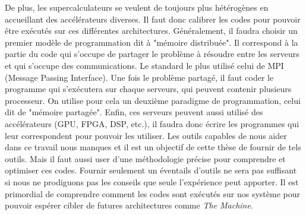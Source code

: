 De plus, les supercalculateurs se veulent de toujours plus hétérogènes en accueillant des accélérateurs diverses. Il faut donc calibrer les codes pour pouvoir être exécutés sur ces différentes architectures. Généralement, il faudra choisir un premier modèle de programmation dit à "mémoire distribuée". Il correspond à la partie du code qui s'occupe de partager le problème à résoudre entre les serveurs et qui s'occupe des communications. Le standard le plus utilisé celui de MPI (Message Passing Interface). Une fois le problème partagé, il faut coder le programme qui s'exécutera sur chaque serveurs, qui peuvent contenir plusieurs processeur. On utilise pour cela un deuxième paradigme de programmation, celui dit de "mémoire partagée". Enfin, ces serveurs peuvent aussi utilisé des accélérateurs (GPU, FPGA, DSP, etc.), il faudra donc écrire les programmes qui leur correspondent pour pouvoir les utiliser.
Les outils capables de nous aider dans ce travail nous manques et il est un objectif de cette thèse de fournir de tels outils. Mais il faut aussi user d'une méthodologie précise pour comprendre et optimiser ces codes. Fournir seulement un éventails d'outils ne sera pas suffisant si nous ne prodiguons pas les conseils que seule l'expérience peut apporter. Il est primordial de comprendre comment les codes sont exécutés sur nos système pour pouvoir espérer cibler de futures architectures comme \textit{The Machine}.




